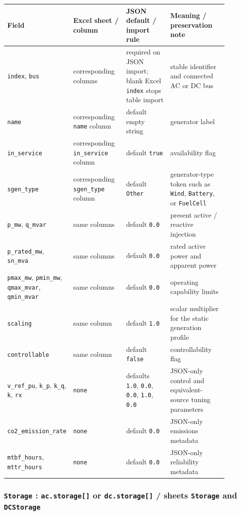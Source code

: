\begin{longtable}{L{0.20\linewidth}L{0.24\linewidth}L{0.20\linewidth}L{0.26\linewidth}}
\toprule
Field & Excel sheet / column & JSON default / import rule & Meaning / preservation note \\
\midrule
\endhead
\texttt{index}, \texttt{bus} & corresponding columns & required on JSON import; blank Excel \texttt{index} stops table import & stable identifier and connected AC or DC bus \\
\texttt{name} & corresponding \texttt{name} column & default empty string & generator label \\
\texttt{in\_service} & corresponding \texttt{in\_service} column & default \texttt{true} & availability flag \\
\texttt{sgen\_type} & corresponding \texttt{sgen\_type} column & default \texttt{Other} & generator-type token such as \texttt{Wind}, \texttt{Battery}, or \texttt{FuelCell} \\
\texttt{p\_mw}, \texttt{q\_mvar} & same columns & default \texttt{0.0} & present active / reactive injection \\
\texttt{p\_rated\_mw}, \texttt{sn\_mva} & same columns & default \texttt{0.0} & rated active power and apparent power \\
\texttt{pmax\_mw}, \texttt{pmin\_mw}, \texttt{qmax\_mvar}, \texttt{qmin\_mvar} & same columns & default \texttt{0.0} & operating capability limits \\
\texttt{scaling} & same column & default \texttt{1.0} & scalar multiplier for the static generation profile \\
\texttt{controllable} & same column & default \texttt{false} & controllability flag \\
\texttt{v\_ref\_pu}, \texttt{k\_p}, \texttt{k\_q}, \texttt{k}, \texttt{rx} & \texttt{none} & defaults \texttt{1.0}, \texttt{0.0}, \texttt{0.0}, \texttt{1.0}, \texttt{0.0} & JSON-only control and equivalent-source tuning parameters \\
\texttt{co2\_emission\_rate} & \texttt{none} & default \texttt{0.0} & JSON-only emissions metadata \\
\texttt{mtbf\_hours}, \texttt{mttr\_hours} & \texttt{none} & default \texttt{0.0} & JSON-only reliability metadata \\
\bottomrule
\end{longtable}

\subsubsection*{\texttt{Storage} : \texttt{ac.storage[]} or \texttt{dc.storage[]} / sheets \texttt{Storage} and \texttt{DCStorage}}

